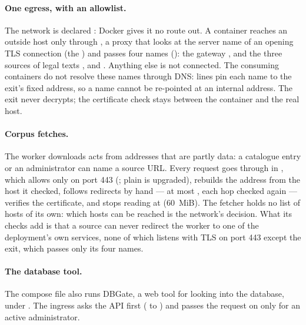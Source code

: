 \paragraph{One egress, with an allowlist.} The network  is declared
 : Docker gives it no route out. A container reaches an outside host only
through , a proxy that looks at the server name of an opening TLS
connection (the ) and passes four names (): the gateway
, and the three sources of legal texts ,
 and . Anything else is not connected. The consuming
containers do not resolve these names through DNS:  lines pin each name to
the exit's fixed address, so a name cannot be re-pointed at an internal address. The exit
never decrypts; the certificate check stays between the container and the real host.

\paragraph{Corpus fetches.} The worker downloads acts from addresses that are partly data: a
catalogue entry or an administrator can name a source URL. Every request goes through
 in , which allows only  on port 443
(; plain  is upgraded), rebuilds the address from the host it
checked, follows redirects by hand --- at most  \code{=} , each hop checked
again --- verifies the certificate, and stops reading at  (60~MiB). The
fetcher holds no list of hosts of its own: which hosts can be reached is the network's
decision. What its checks add is that a source can never redirect the worker to one of the
deployment's own services, none of which listens with TLS on port 443 except the exit, which
passes only its four names.

\paragraph{The database tool.} The compose file also runs DBGate, a web tool for looking
into the database, under . The ingress asks the API first
( to ) and passes the request on
only for an active administrator.


